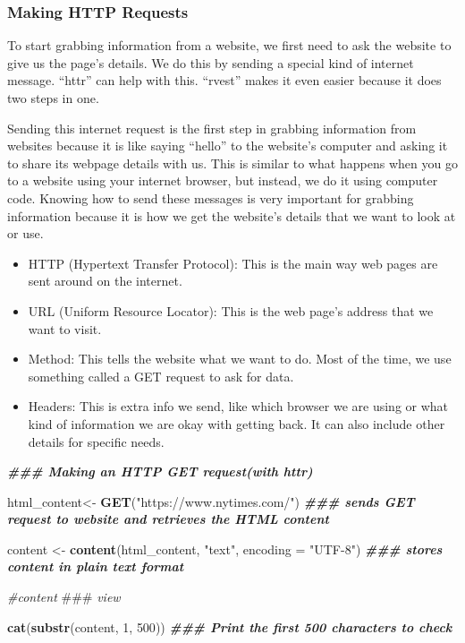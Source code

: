 \documentclass[
]{article}
\newenvironment{Shaded}{\begin{snugshade}}{\end{snugshade}}
\newcommand{\AlertTok}[1]{\textcolor[rgb]{0.94,0.16,0.16}{#1}}
\newcommand{\AttributeTok}[1]{\textcolor[rgb]{0.13,0.29,0.53}{#1}}
\newcommand{\CommentTok}[1]{\textcolor[rgb]{0.56,0.35,0.01}{\textit{#1}}}
\newcommand{\DecValTok}[1]{\textcolor[rgb]{0.00,0.00,0.81}{#1}}
\newcommand{\DocumentationTok}[1]{\textcolor[rgb]{0.56,0.35,0.01}{\textbf{\textit{#1}}}}
\newcommand{\FunctionTok}[1]{\textcolor[rgb]{0.13,0.29,0.53}{\textbf{#1}}}
\newcommand{\NormalTok}[1]{#1}
\newcommand{\OtherTok}[1]{\textcolor[rgb]{0.56,0.35,0.01}{#1}}
\newcommand{\StringTok}[1]{\textcolor[rgb]{0.31,0.60,0.02}{#1}}
\providecommand{\tightlist}{%
  \setlength{\itemsep}{0pt}\setlength{\parskip}{0pt}}
\begin{document}
\hypertarget{making-http-requests}{%
\subsubsection{Making HTTP Requests}\label{making-http-requests}}

To start grabbing information from a website, we first need to ask the
website to give us the page's details. We do this by sending a special
kind of internet message. ``httr'' can help with this. ``rvest'' makes
it even easier because it does two steps in one.

Sending this internet request is the first step in grabbing information
from websites because it is like saying ``hello'' to the website's
computer and asking it to share its webpage details with us. This is
similar to what happens when you go to a website using your internet
browser, but instead, we do it using computer code. Knowing how to send
these messages is very important for grabbing information because it is
how we get the website's details that we want to look at or use.

\begin{itemize}
\tightlist
\item
  HTTP (Hypertext Transfer Protocol): This is the main way web pages are
  sent around on the internet.
\item
  URL (Uniform Resource Locator): This is the web page's address that we
  want to visit.
\item
  Method: This tells the website what we want to do. Most of the time,
  we use something called a GET request to ask for data.
\item
  Headers: This is extra info we send, like which browser we are using
  or what kind of information we are okay with getting back. It can also
  include other details for specific needs.
\end{itemize}

\begin{Shaded}
\begin{Highlighting}[]
\DocumentationTok{\#\#\# Making an HTTP GET request(with httr)}

\NormalTok{html\_content}\OtherTok{\textless{}{-}} \FunctionTok{GET}\NormalTok{(}\StringTok{"https://www.nytimes.com/"}\NormalTok{)    }\DocumentationTok{\#\#\# sends GET request to website and retrieves the HTML content}

\NormalTok{content }\OtherTok{\textless{}{-}} \FunctionTok{content}\NormalTok{(html\_content, }\StringTok{"text"}\NormalTok{, }
                   \AttributeTok{encoding =} \StringTok{"UTF{-}8"}\NormalTok{)           }\DocumentationTok{\#\#\# stores content in plain text format}

\CommentTok{\#content                                         }\AlertTok{\#\#\#}\CommentTok{ view      }

\FunctionTok{cat}\NormalTok{(}\FunctionTok{substr}\NormalTok{(content, }\DecValTok{1}\NormalTok{, }\DecValTok{500}\NormalTok{))                     }\DocumentationTok{\#\#\# Print the first 500 characters to check}
\end{Highlighting}
\end{Shaded}
\end{document}

